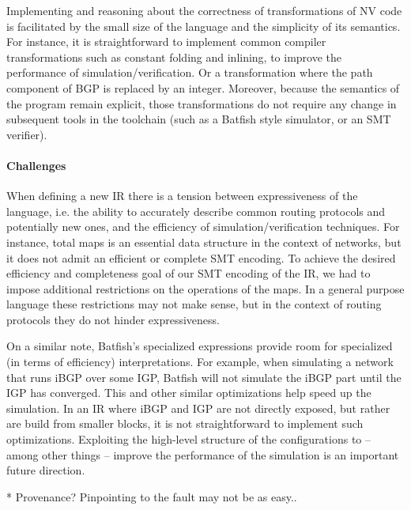 \documentclass[sigconf,10pt]{acmart}
\begin{document}
Implementing and reasoning about the correctness of transformations of
NV code is facilitated by the small size of the language and the
simplicity of its semantics. For instance, it is straightforward to
implement common compiler transformations such as constant folding and
inlining, to improve the performance of simulation/verification. Or a
transformation where the path component of BGP is replaced by an
integer. Moreover, because the semantics of the program remain
explicit, those transformations do not require any change in
subsequent tools in the toolchain (such as a Batfish style simulator,
or an SMT verifier).

\paragraph{Challenges}

When defining a new IR there is a tension between expressiveness of
the language, i.e. the ability to accurately describe common routing
protocols and potentially new ones, and the efficiency of
simulation/verification techniques. For instance, total maps is an
essential data structure in the context of networks, but it does not
admit an efficient or complete SMT encoding. To achieve the desired
efficiency and completeness goal of our SMT encoding of the IR, we had
to impose additional restrictions on the operations of the maps. In a
general purpose language these restrictions may not make sense, but in
the context of routing protocols they do not hinder expressiveness.

On a similar note, Batfish's specialized expressions provide room for
specialized (in terms of efficiency) interpretations. For example,
when simulating a network that runs iBGP over some IGP, Batfish will
not simulate the iBGP part until the IGP has converged. This and other
similar optimizations help speed up the simulation. In an IR where
iBGP and IGP are not directly exposed, but rather are build from
smaller blocks, it is not straightforward to implement such
optimizations. Exploiting the high-level structure of the
configurations to -- among other things -- improve the performance of
the simulation is an important future direction.

* Provenance? Pinpointing to the fault may not be as easy..





\end{document}
